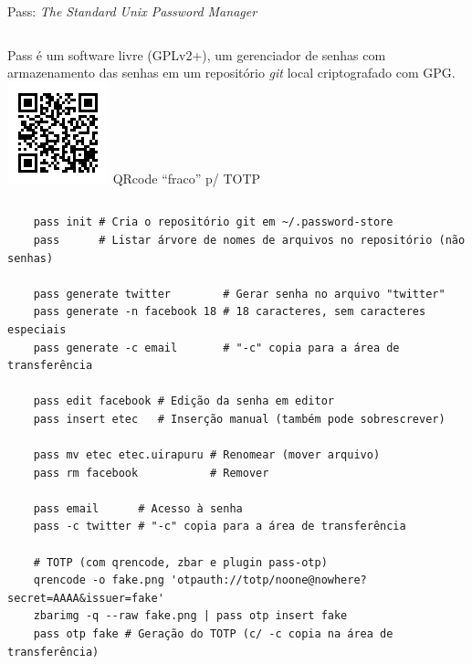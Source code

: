 \documentclass[utf8]{beamer}
\begin{document}
\begin{frame}[fragile]{Pass: \emph{The Standard Unix Password Manager}}
  \begin{columns}[c]
    Pass é um software livre (GPLv2+), um gerenciador de senhas
    com armazenamento das senhas em um repositório \emph{git} local
    criptografado com GPG.
    \centering
    \includegraphics[width=.8\textwidth]{fake.png}
    \vfill
    \fontsize{7pt}{7pt}\selectfont
    QRcode ``fraco'' p/ TOTP
  \end{columns}
  \vfill
  \begin{verbatim}
    pass init # Cria o repositório git em ~/.password-store
    pass      # Listar árvore de nomes de arquivos no repositório (não senhas)

    pass generate twitter        # Gerar senha no arquivo "twitter"
    pass generate -n facebook 18 # 18 caracteres, sem caracteres especiais
    pass generate -c email       # "-c" copia para a área de transferência

    pass edit facebook # Edição da senha em editor
    pass insert etec   # Inserção manual (também pode sobrescrever)

    pass mv etec etec.uirapuru # Renomear (mover arquivo)
    pass rm facebook           # Remover

    pass email      # Acesso à senha
    pass -c twitter # "-c" copia para a área de transferência

    # TOTP (com qrencode, zbar e plugin pass-otp)
    qrencode -o fake.png 'otpauth://totp/noone@nowhere?secret=AAAA&issuer=fake'
    zbarimg -q --raw fake.png | pass otp insert fake
    pass otp fake # Geração do TOTP (c/ -c copia na área de transferência)
  \end{verbatim}
\end{frame}
\end{document}
